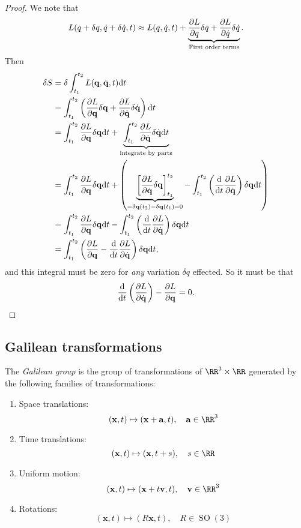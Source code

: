 \documentclass{article}
\DeclareMathOperator{\SO}{SO}
\begin{document}
\begin{proof}
    We note that
    \[
        L(q + \delta q, \dot{q} + \delta \dot{q}, t) \approx L(q,\dot{q},t) + \underbrace{\pdv{L}{q}\delta q + \pdv{L}{\dot{q}} \delta \dot{q}}_{\text{First order terms}}.
    \]
    Then
    \begin{align*}
        \delta S &= \delta \int_{t_1}^{t_2} L(\mathbf{q},\dot{\mathbf{q}},t) \dd t \\
                 &= \int_{t_1}^{t_2} \left(\pdv{L}{\mathbf{q}}\delta\mathbf{q} + \pdv{L}{\dot{\mathbf{q}}}\delta\dot{\mathbf{q}}\right)\dd t \\
                 &= \int_{t_1}^{t_2} \pdv{L}{\mathbf{q}}\delta\mathbf{q} \dd t + \underbrace{\int_{t_1}^{t_2} \pdv{L}{\dot{\mathbf{q}}}\delta\dot{\mathbf{q}}\dd t}_{\text{integrate by parts}} \\
                 &= \int_{t_1}^{t_2} \pdv{L}{\mathbf{q}}\delta\mathbf{q} \dd t + \left(\underbrace{\left[\pdv{L}{\dot{\mathbf{q}}}\delta \mathbf{q}\right]_{t_1}^{t_2}}_{=\delta\mathbf{q}(t_2)-\delta\mathbf{q}(t_1)=0} - \int_{t_1}^{t_2} \left(\dv{t}\pdv{L}{\dot{\mathbf{q}}}\right)\delta\mathbf{q}\dd t\right) \\
                 &= \int_{t_1}^{t_2} \pdv{L}{\mathbf{q}}\delta\mathbf{q} \dd t  - \int_{t_1}^{t_2} \left(\dv{t}\pdv{L}{\dot{\mathbf{q}}}\right)\delta\mathbf{q}\dd t \\
                 &= \int_{t_1}^{t_2} \left(\pdv{L}{\mathbf{q}} - \dv{t}\pdv{L}{\dot{\mathbf{q}}}\right)\delta\mathbf{q}\dd t,
    \end{align*}
    and this integral must be zero for \textit{any} variation $\delta q$ effected.
    So it must be that
    \[
        \dv{t} \left(\pdv{L}{\dot{\mathbf{q}}}\right) - \pdv{L}{\mathbf{q}} = 0.
    \]
\end{proof}

\subsection{Galilean transformations}

\begin{definition}
    The \textit{Galilean group} is the group of transformations of $\RR^3 \times \RR$ generated by the following families of transformations:
    \begin{enumerate}[label=(\alph*)]
        \item 
            Space translations:
            \[
                (\mathbf{x}, t) \mapsto (\mathbf{x}+\mathbf{a}, t), \quad \mathbf{a} \in \RR^3
            \]
        \item
            Time translations:
            \[
                (\mathbf{x}, t) \mapsto (\mathbf{x}, t+s), \quad s \in \RR
            \]
        \item
            Uniform motion:
            \[
                (\mathbf{x}, t) \mapsto (\mathbf{x} + t\mathbf{v}, t), \quad \mathbf{v} \in \RR^3
            \]
        \item
            Rotations:
            \[
                (\mathbf{x}, t) \mapsto (R\mathbf{x}, t), \quad R \in \SO(3)
            \]
    \end{enumerate}
\end{definition}
    
\end{document}

